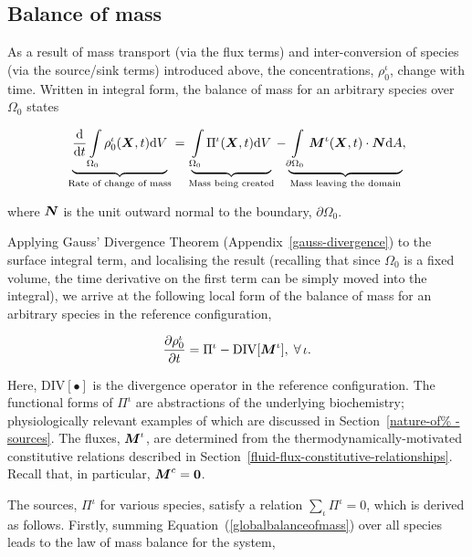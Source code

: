 \subsection{Balance of mass}
\label{balance-of-mass}

As a result of mass transport (via the flux terms) and
inter-conversion of species (via the source/sink terms) introduced
above, the concentrations, $\rho_0^\iota$, change with time. Written
in integral form, the balance of mass for an arbitrary species over
$\Omega_0$ states

\begin{equation}
\underbrace{\frac{\mathrm{d}}{\mathrm{d}t} \int\limits_{\Omega_0}
  \rho_0^\iota (\mbox{\boldmath$ X$},t)\mathrm{d}V}_{\text{Rate of change of mass}} =
\underbrace{\int\limits_{\Omega_0} \Pi^\iota
  (\mbox{\boldmath$ X$},t)\mathrm{d}V}_{\text{Mass being created}}
-\underbrace{\int\limits_{\partial\Omega_0}\mbox{\boldmath$ M$}^\iota(\mbox{\boldmath$ X$},t)\cdot\mbox{\boldmath$ N$}
  \mathrm{d}A}_{\text{Mass leaving the domain}},
\label{globalbalanceofmass}
\end{equation}

\noindent where $\mbox{\boldmath$ N$}$ is the unit outward normal to the boundary,
$\partial\Omega_0$.

Applying Gauss' Divergence Theorem (Appendix~\ref{gauss-divergence})
to the surface integral term, and localising the result (recalling
that since $\Omega_0$ is a fixed volume, the time derivative on the
first term can be simply moved into the integral), we arrive at the
following local form of the balance of mass for an arbitrary species
in the reference configuration,

\begin{equation}
\frac{\partial\rho_0^\iota}{\partial t} = \Pi^\iota -
\mathrm{DIV}[\mbox{\boldmath$ M$}^\iota],\;\forall\,\iota.
\label{localbalanceofmass}
\end{equation}

\noindent Here, $\mathrm{DIV[\bullet]}$ is the divergence operator in
the reference configuration. The functional forms of $\Pi^\iota$ are
abstractions of the underlying biochemistry; physiologically relevant
examples of which are discussed in Section~\ref{nature-of%
  -sources}. The fluxes, $\mbox{\boldmath$ M$}^\iota$, are determined from the
thermodynamically-motivated constitutive relations described in
Section~\ref{fluid-flux-constitutive-relationships}. Recall that, in
particular, $\mbox{\boldmath$ M$}^{c} = {\bf 0}$.

The sources, $\Pi^\iota$ for various species, satisfy a relation
$\sum\limits_\iota\Pi^\iota = 0$, which is derived as
follows. Firstly, summing Equation~(\ref{globalbalanceofmass}) over
all species leads to the law of mass balance for the system,

